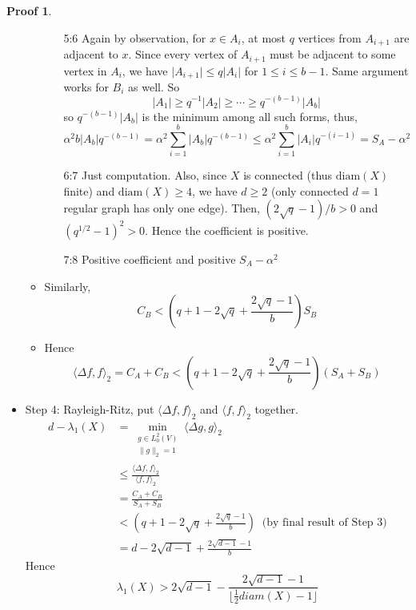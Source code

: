 \documentclass{book}
\newcommand{\diam}[1]{\textrm{diam}( #1 )}
\newcommand{\inner}[1]{\langle #1 \rangle}
\newcommand{\norm}[1]{\lVert #1 \rVert}
\newcommand{\abs}[1]{\lvert #1 \rvert }
\theoremstyle{definition}
\theoremstyle{remarkstyle}
\newtheorem*{myproof}{Proof}%
\begin{document}
\begin{myproof}
\begin{itemize}
\begin{itemize}
\begin{itemize}
                \item[5:6] Again by observation, for $x \in A_{i} $, at most $q$ vertices from $A_{i+1} $ are adjacent to $x$. Since every vertex of $A_{i+1} $ must be adjacent to some vertex in $A_{i} $, we have $\abs{A_{i+1}}\le q\abs{A_{i}}$ for $1\le i \le b-1$. Same argument works for $B_{i} $ as well. So $$\abs{A_{1}} \ge q^{-1}\abs{A_{2}} \ge \cdots \ge q^{-(b-1)}\abs{A_{b}} $$
                so $q^{-(b-1)}\abs{A_{b}}$ is the minimum among all such forms, thus, $$\alpha^{2}b\abs{A_{b}}q^{-(b-1)} = \alpha^{2}\sum^{b}_{i=1}\abs{A_{b}}q^{-(b-1)} \le \alpha^{2}\sum^{b}_{i=1}\abs{A_{i}}q^{-(i-1)} = S_{A}-\alpha^{2} $$ 
                \item[6:7] Just computation. Also, since $X$ is connected (thus $\diam{X}$ finite) and $\diam{X} \ge 4$, we have $d \ge 2$ (only connected $d=1$ regular graph has only one edge). Then, $(2\sqrt{q}-1)/b>0$ and $(q^{1/2}-1)^{2} >0$. Hence the coefficient is positive. 
                \item[7:8] Positive coefficient and positive $S_{A}-\alpha^{2}$
            \end{itemize}
            \item Similarly, $$C_{B} < (q+1-2\sqrt{q}+\frac{2\sqrt{q}-1}{b})S_{B}  $$
            \item Hence $$\inner{\Delta f,f}_{2} = C_{A}+C_{B} < (q+1-2\sqrt{q}+\frac{2\sqrt{q}-1}{b})(S_{A}+S_{B})$$
        \end{itemize}
        \item Step 4: Rayleigh-Ritz, put $\inner{\Delta f, f}_{2} $ and $\inner{f,f}_{2} $ together. 
        \begin{align*}
            d-\lambda_{1}(X) 
            &= \min_{\substack{g\in L^{2}_{0}(V) \\ \norm{g}_{2}=1 }}\inner{\Delta g, g}_{2} \\
            &\le \frac{\inner{\Delta f, f}_{2}}{\inner{f,f}_{2}} \\
            &= \frac{C_{A}+C_{B}}{S_{A}+S_{B}} \\ 
            &< (q+1-2\sqrt{q}+\frac{2\sqrt{q}-1}{b}) \; \; \textrm{(by final result of Step 3)} \\
            &= d-2\sqrt{d-1}+\frac{2\sqrt{d-1}-1}{b}   
        \end{align*}
        Hence $$\lambda_{1}(X) > 2\sqrt{d-1}-\frac{2\sqrt{d-1}-1}{\lfloor \frac{1}{2}diam(X)-1 \rfloor}$$
    \end{itemize}
\end{myproof}
\end{document}

